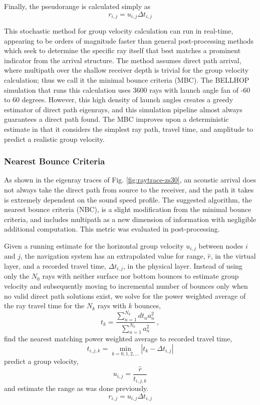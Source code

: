 Finally, the pseudorange is calculated simply as
\begin{equation}
r_{i,j} = u_{i,j} \Delta t_{i,j} 
\end{equation}

This stochastic method for group velocity calculation can run in real-time, appearing to be orders of magnitude faster than general post-processing methods which seek to determine the specific ray itself that best matches a prominent indicator from the arrival structure.
The method assumes direct path arrival, where multipath over the shallow receiver depth is trivial for the group velocity calculation; thus we call it the minimal bounce criteria (MBC).
The BELLHOP simulation that runs this calculation uses 3600 rays with launch angle fan of -60 to 60 degrees.
However, this high density of launch angles creates a greedy estimator of direct path eigenrays, and this simulation pipeline almost always guarantees a direct path found.
The MBC improves upon a deterministic estimate in that it considers the simplest ray path, travel time, and amplitude to predict a realistic group velocity.

\subsubsection{Nearest Bounce Criteria}

As shown in the eigenray traces of Fig. \ref{fig:raytrace-zs30}, an acoustic arrival does not always take the direct path from source to the receiver, and the path it takes is extremely dependent on the sound speed profile.
The suggested algorithm, the nearest bounce criteria (NBC), is a slight modification from the minimal bounce criteria, and includes multipath as a new dimension of information with negligible additional computation.
This metric was evaluated in post-processing.

Given a running estimate for the horizontal group velocity $u_{i,j}$ between nodes $i$ and $j$, the navigation system has an extrapolated value for range, $\hat{r}$, in the virtual layer, and a recorded travel time, $\Delta t_{i,j}$, in the physical layer.
Instead of using only the $N_0$ rays with neither surface nor bottom bounces to estimate group velocity and subsequently moving to incremental number of bounces only when no valid direct path solutions exist, we solve for the power weighted average of the ray travel time for the $N_k$ rays with $k$ bounces,
\begin{equation}
t_k = \frac{\sum_{n=1}^{N_{k}} dt_{n}a_{n}^{2}}{\sum_{n=1}^{N_{k}} a_{n}^{2}} ~, 
\end{equation}
find the nearest matching power weighted average to recorded travel time,
\begin{equation}
t_{i,j,k} = \min_{k=0,1,2,...} \left| t_k - \Delta t_{i,j} \right|
\end{equation}
predict a group velocity,
\begin{equation}
u_{i,j} = \dfrac{\hat{r}}{t_{i,j,k}}
\end{equation}
and estimate the range as was done previously.
\begin{equation}
r_{i,j} = u_{i,j}\Delta t_{i,j}
\end{equation}

